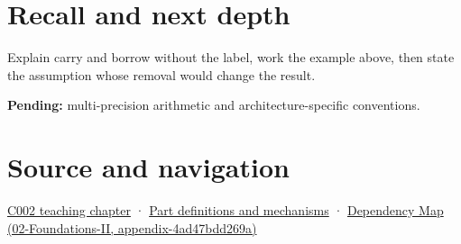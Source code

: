 \section{Recall and next depth}\label{appendix-d52d5f78ffd1-recall-and-next-depth}

Explain carry and borrow without the label, work the example above, then state the assumption whose removal would change the result.

\textbf{Pending:} multi-precision arithmetic and architecture-specific conventions.

\section{Source and navigation}\label{appendix-d52d5f78ffd1-source-and-navigation}

\href{Continuous\%20Notes/Computing\%20Foundations\%20-\%20From\%20Bits\%20to\%20C++\%20and\%20Systems\%20APIs\#Arithmetic\%20becomes\%20a\%20policy}{C002 teaching chapter} · \hyperref[appendix-fd090d982a15]{Part definitions and mechanisms} · \href{../02-Foundations-II/main.pdf\#nameddest=appendix-4ad47bdd269a}{Dependency Map (02-Foundations-II, appendix-4ad47bdd269a)}
